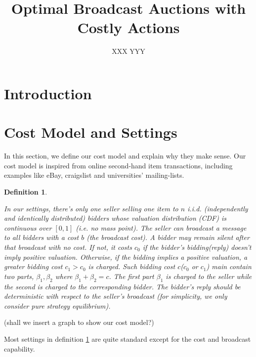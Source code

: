 \documentclass{aamas2012}
\newtheorem{definition}{Definition}
\begin{document}
\title{Optimal Broadcast Auctions with Costly Actions}


\author{ \alignauthor XXX \alignauthor YYY }


\maketitle

\section{Introduction}

\section{Cost Model and Settings}

In this section, we define our cost model and explain why they make sense. Our
cost model is inspired from online second-hand item transactions, including
examples like eBay, craigslist and universities' mailing-lists.


\begin{definition}\label{def:model}

In our settings, there's only one seller selling one item to $n$ i.i.d.
(independently and identically distributed) bidders whose valuation distribution
(CDF) is continuous over $[0, 1]$ (i.e. no mass point).  The seller can
broadcast a message to all bidders with a cost $b$ (the broadcast cost). A
bidder may remain silent after that broadcast with no cost.  If not, it costs
$c_0$ if the bidder's bidding(reply) doesn't imply positive valuation.
Otherwise, if the bidding implies a positive valuation, a greater bidding cost
$c_1 > c_0$ is charged.  Such bidding cost $c$($c_0$ or $c_1$) main contain two
parts, $\beta_1, \beta_2$ where $\beta_1+\beta_2 = c$.  The first part
$\beta_1$ is charged to the seller while the second is charged to the
corresponding bidder. The bidder's reply should be deterministic with respect
to the seller's broadcast (for simplicity, we only consider pure strategy
equilibrium).

\end{definition}

(shall we insert a graph to show our cost model?)

Most settings in definition \ref{def:model} are quite standard except for the
cost and broadcast capability.
\end{document}
